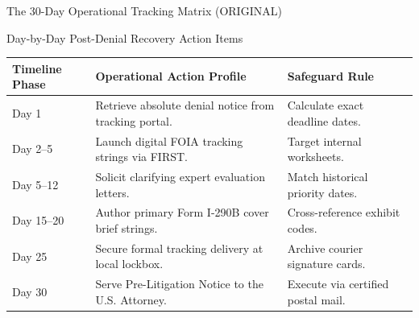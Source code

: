 \documentclass[11pt]{beamer}
\begin{document}
	
	\begin{frame}{The 30-Day Operational Tracking Matrix (ORIGINAL)}
		\scriptsize
		\begin{block}{Day-by-Day Post-Denial Recovery Action Items}
			\centering
			\begin{tabular}{|p{2cm}|p{6cm}|p{3cm}|}
				\hline
				\textbf{Timeline Phase} & \textbf{Operational Action Profile} & \textbf{Safeguard Rule} \\
				\hline
				Day 1 & Retrieve absolute denial notice from tracking portal. & Calculate exact deadline dates. \\
				\hline
				Day 2--5 & Launch digital FOIA tracking strings via FIRST. & Target internal worksheets. \\
				\hline
				Day 5--12 & Solicit clarifying expert evaluation letters. & Match historical priority dates. \\
				\hline
				Day 15--20 & Author primary Form I-290B cover brief strings. & Cross-reference exhibit codes. \\
				\hline
				Day 25 & Secure formal tracking delivery at local lockbox. & Archive courier signature cards. \\
				\hline
				Day 30 & Serve Pre-Litigation Notice to the U.S. Attorney. & Execute via certified postal mail. \\
				\hline
			\end{tabular}
		\end{block}
	\end{frame}
	
	
\end{document}
